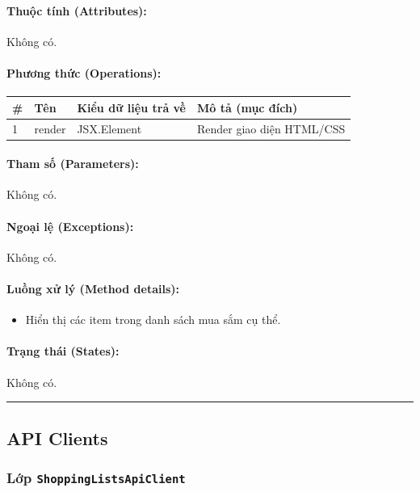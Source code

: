\documentclass[12pt,a4paper]{article}
\begin{document}
\paragraph{Thuộc tính (Attributes):}
Không có.

\paragraph{Phương thức (Operations):}
\begin{longtable}{|p{0.6cm}|p{5.0cm}|p{2.8cm}|p{5.4cm}|}
\hline
\textbf{\#} & \textbf{Tên} & \textbf{Kiểu dữ liệu trả về} & \textbf{Mô tả (mục đích)} \\ \hline
\endhead
1 & render & JSX.Element & Render giao diện HTML/CSS \\ \hline
\end{longtable}

\paragraph{Tham số (Parameters):}
Không có.

\paragraph{Ngoại lệ (Exceptions):}
Không có.

\paragraph{Luồng xử lý (Method details):}
\begin{itemize}[leftmargin=*]
    \item Hiển thị các item trong danh sách mua sắm cụ thể.
\end{itemize}


\paragraph{Trạng thái (States):}
Không có.

\vskip 0.5cm
\noindent\rule{\textwidth}{0.5pt}
\vskip 0.5cm

\subsection{API Clients}


\subsubsection{Lớp \texttt{ShoppingListsApiClient}}
\end{document}
